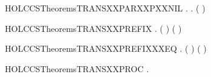 \newcommand{\HOLCCSTheoremsTRANSXXPARXXNOXXSYNCR}{\UseVerbatim{HOLCCSTheoremsTRANSXXPARXXNOXXSYNCR}}
\begin{SaveVerbatim}{HOLCCSTheoremsTRANSXXPARXXPXXNIL}
\HOLTokenTurnstile{} \HOLSymConst{\HOLTokenForall{}}  .  \HOLSymConst{\ensuremath{\parallel}}  \HOLTokenTransBegin{}\HOLTokenTransEnd {} \HOLSymConst{\HOLTokenImp{}} \HOLSymConst{\HOLTokenExists{}}.  \HOLTokenTransBegin{}\HOLTokenTransEnd {} \HOLSymConst{\HOLTokenConj{}} ( \HOLSymConst{=}  \HOLSymConst{\ensuremath{\parallel}} )
\end{SaveVerbatim}
\newcommand{\HOLCCSTheoremsTRANSXXPARXXPXXNIL}{\UseVerbatim{HOLCCSTheoremsTRANSXXPARXXPXXNIL}}
\begin{SaveVerbatim}{HOLCCSTheoremsTRANSXXPREFIX}
\HOLTokenTurnstile{} \HOLSymConst{\HOLTokenForall{}}   .  \HOLTokenTransBegin{}\HOLTokenTransEnd {} \HOLSymConst{\HOLTokenImp{}} ( \HOLSymConst{=} ) \HOLSymConst{\HOLTokenConj{}} ( \HOLSymConst{=} )
\end{SaveVerbatim}
\newcommand{\HOLCCSTheoremsTRANSXXPREFIX}{\UseVerbatim{HOLCCSTheoremsTRANSXXPREFIX}}
\begin{SaveVerbatim}{HOLCCSTheoremsTRANSXXPREFIXXXEQ}
\HOLTokenTurnstile{} \HOLSymConst{\HOLTokenForall{}}   .  \HOLTokenTransBegin{}\HOLTokenTransEnd {} \HOLSymConst{\HOLTokenEquiv{}} ( \HOLSymConst{=} ) \HOLSymConst{\HOLTokenConj{}} ( \HOLSymConst{=} )
\end{SaveVerbatim}
\newcommand{\HOLCCSTheoremsTRANSXXPREFIXXXEQ}{\UseVerbatim{HOLCCSTheoremsTRANSXXPREFIXXXEQ}}
\begin{SaveVerbatim}{HOLCCSTheoremsTRANSXXPROC}
\HOLTokenTurnstile{} \HOLSymConst{\HOLTokenForall{}}  .  \HOLTokenTransBegin{}\HOLTokenTransEnd {} \HOLSymConst{\HOLTokenConj{}}   \HOLSymConst{\HOLTokenImp{}}  
\end{SaveVerbatim}
